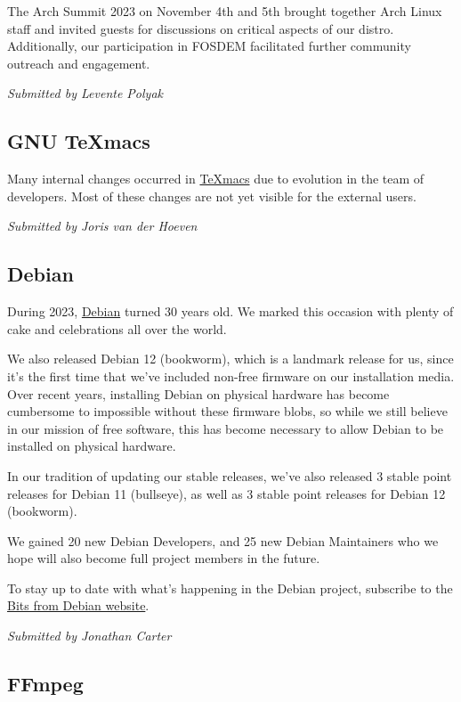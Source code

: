 \documentclass[a4paper]{report}
\begin{document}
The Arch Summit 2023 on November 4th and 5th brought together Arch Linux staff and invited guests for discussions on critical aspects of our distro.  Additionally, our participation in FOSDEM facilitated further community outreach and engagement.

{\em Submitted by Levente Polyak}

\subsection{GNU TeXmacs}

Many internal changes occurred in \href{https://www.texmacs.org/}{TeXmacs} due to evolution in the team of developers.  Most of these changes are not yet visible for the external users.

{\em Submitted by Joris van der Hoeven}

\subsection{Debian}

During 2023, \href{https://www.debian.org/}{Debian} turned 30 years old. We marked this occasion with plenty of cake and celebrations all over the world.

We also released Debian 12 (bookworm), which is a landmark release for us, since it's the first time that we've included non-free firmware on our installation media. Over recent years, installing Debian on physical hardware has become cumbersome to impossible without these firmware blobs, so while we still believe in our mission of free software, this has become necessary to allow Debian to be installed on physical hardware.

In our tradition of updating our stable releases, we've also released 3 stable point releases for Debian 11 (bullseye), as well as 3 stable point releases for Debian 12 (bookworm).

We gained 20 new Debian Developers, and 25 new Debian Maintainers who we hope will also become full project members in the future.

To stay up to date with what's happening in the Debian project, subscribe to
the \href{https://bits.debian.org/}{Bits from Debian website}.

{\em Submitted by Jonathan Carter}

\subsection{FFmpeg}
\end{document}
